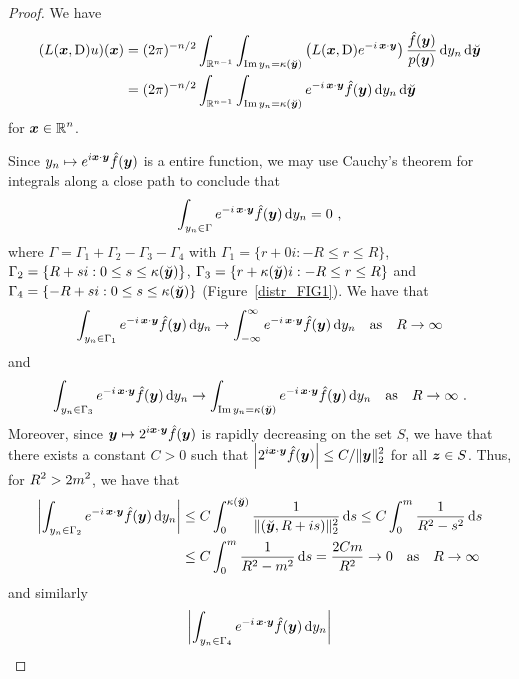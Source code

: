 \begin{proof}
We have
\begin{align}
(L({\bm{x}},\operatorname{D})u)({\bm{x}}) &= 
(2\pi)^{-n/2} \int_{\mathbb{R}^{n-1}} \int_{\operatorname{Im} y_n = \kappa(\breve{{\bm{y}}})}
\left( L({\bm{x}},\operatorname{D}) e^{-i\, {\bm{x}}\cdot{\bm{y}}} \right)
\frac{\hat{f}({\bm{y}})}{p({\bm{y}})} \,\mathrm{d}{y_n}\,\mathrm{d}{\breve{{\bm{y}}}}
\nonumber \\
&= (2\pi)^{-n/2} \int_{\mathbb{R}^{n-1}} \int_{\operatorname{Im} y_n = \kappa(\breve{{\bm{y}}})}
e^{-i\, {\bm{x}}\cdot{\bm{y}}} \hat{f}({\bm{y}}) \,\mathrm{d}{y_n}\,\mathrm{d}{\breve{{\bm{y}}}}
\label{distrlPDE3eq1}
\end{align}
for $\displaystyle {\bm{x}} \in \mathbb{R}^n$.

Since $\displaystyle y_n \mapsto e^{i{\bm{x}}\cdot{\bm{y}}} \hat{f}({\bm{y}})$ is a
entire function, we may use Cauchy's theorem for
integrals along a close path to conclude that
\[
\int_{y_n \in \Gamma}
e^{-i\, {\bm{x}}\cdot{\bm{y}}} \hat{f}({\bm{y}}) \,\mathrm{d}{y_n} = 0 \ ,
\]
where $\Gamma = \Gamma_1 + \Gamma_2 - \Gamma_3 - \Gamma_4$ with
$\Gamma_1 = \{ r+ 0 i : -R \leq r \leq R \}$,
$\Gamma_2 = \{ R+ s i : 0 \leq s \leq \kappa(\breve{{\bm{y}}}) \}$,
$\Gamma_3 = \{ r+ \kappa(\breve{{\bm{y}}}) i : -R \leq r \leq R \}$
and
$\Gamma_4 = \{ -R+ s i : 0 \leq s \leq \kappa(\breve{{\bm{y}}}) \}$
(Figure~\ref{distr_FIG1}).
We have that
\[
\int_{y_n \in \Gamma_1}
e^{-i\, {\bm{x}}\cdot{\bm{y}}} \hat{f}({\bm{y}}) \,\mathrm{d}{y_n}
\to
\int_{-\infty}^{\infty}
e^{-i\, {\bm{x}}\cdot{\bm{y}}} \hat{f}({\bm{y}}) \,\mathrm{d}{y_n}
\quad \text{as} \quad R \to \infty
\]
and
\[
\int_{y_n \in \Gamma_3}
e^{-i\, {\bm{x}}\cdot{\bm{y}}} \hat{f}({\bm{y}}) \,\mathrm{d}{y_n}
\to 
\int_{\operatorname{Im} y_n = \kappa(\breve{{\bm{y}}})}
e^{-i\, {\bm{x}}\cdot{\bm{y}}} \hat{f}({\bm{y}}) \,\mathrm{d}{y_n}
\quad \text{as} \quad R \to \infty \ .
\]
Moreover, since
$\displaystyle {\bm{y}} \mapsto 2^{i{\bm{x}}\cdot{\bm{y}}} \hat{f}({\bm{y}})$ is
rapidly decreasing on the set $S$, we have that there exists a
constant $C>0$ such that
$\displaystyle \left| 2^{i{\bm{x}}\cdot{\bm{y}}} \hat{f}({\bm{y}}) \right| \leq
C/ \|{\bm{y}}\|_2^2$ for all ${\bm{z}} \in S$.  Thus, for
$\displaystyle R^2>2m^2$, we have that
\begin{align*}
\left| \int_{y_n \in \Gamma_2}
e^{-i\, {\bm{x}}\cdot{\bm{y}}} \hat{f}({\bm{y}}) \,\mathrm{d}{y_n} \right|
& \leq C \int_0^{\kappa(\breve{{\bm{y}}})}
\frac{1}{\|(\breve{{\bm{y}}},R+is)\|_2^2} \,\mathrm{d}{s}
\leq C \int_0^m \frac{1}{ R^2 - s^2} \,\mathrm{d}{s} \\
& \leq C \int_0^m \frac{1}{ R^2 - m^2} \,\mathrm{d}{s}
= \frac{2Cm}{R^2} \to 0
\quad \text{as} \quad R \to \infty
\end{align*}
and similarly
\begin{align*}
\left| \int_{y_n \in \Gamma_4}
e^{-i\, \VEC{x}\cdot\VEC{y}} \hat{f}(\VEC{y}) \dx{y_n} \right|

\end{align*}
\end{proof}
